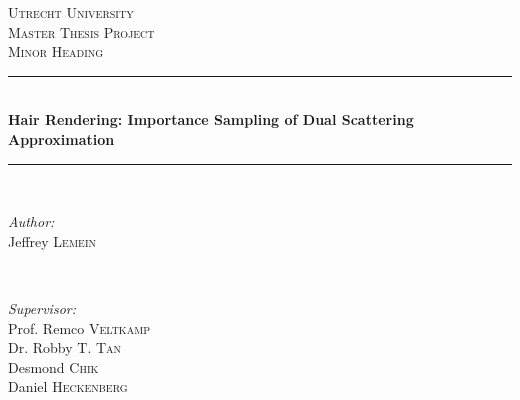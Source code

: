 \documentclass[11pt,a4paper]{report}
\begin{document}
\begin{titlepage}

\newcommand{\HRule}{\rule{\linewidth}{0.5mm}} %

\center %
 

\textsc{\LARGE Utrecht University}\\[1.5cm] %
\textsc{\Large Master Thesis Project}\\[0.5cm] %
\textsc{\large Minor Heading}\\[0.5cm] %


\HRule \\[0.4cm]
{ \huge \bfseries Hair Rendering: Importance Sampling of Dual Scattering Approximation}\\[0.4cm] %
\HRule \\[1.5cm]
 

\begin{minipage}{0.4\textwidth}
\begin{flushleft} \large
\emph{Author:}\\
Jeffrey \textsc{Lemein}%
\end{flushleft}
\end{minipage}
~
\begin{minipage}{0.4\textwidth}
\begin{flushright} \large
\emph{Supervisor:} \\
Prof. Remco \textsc{Veltkamp} \\ %
Dr. Robby T. \textsc{Tan} \\ %
Desmond \textsc{Chik} \\ %
Daniel \textsc{Heckenberg}  %
\end{flushright}
\end{minipage}\\[4cm]


\end{titlepage}
\end{document}
